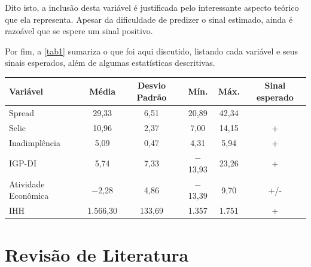 \documentclass[a4paper, article, 12pt, openany, oneside, english, brazil]{abntex2}
\numberwithin{equation}{section}
\begin{document}
    Dito isto, a inclusão desta variável é justificada pelo interessante aspecto teórico que ela representa. Apesar da dificuldade de predizer o sinal estimado, ainda é razoável que se espere um sinal positivo.

    Por fim, a \autoref{tab1} sumariza o que foi aqui discutido, listando cada variável e seus sinais esperados, além de algumas estatísticas descritivas.

    \begin{table}[h]
        {
            \begin{tabular}
                {@{\extracolsep{5pt}}lccccc}
                \midrule
                Variável              & \multicolumn{1}{c}{Média} & \multicolumn{1}{c}{Desvio Padrão} & \multicolumn{1}{c}{Mín.} & \multicolumn{1}{c}{Máx.} & \multicolumn{1}{c}{Sinal esperado} \\
                \midrule
                Spread                & 29,33                     & 6,51                              & 20,89                    & 42,34                    &  \\
                Selic                 & 10,96                     & 2,37                              & 7,00                     & 14,15                    & + \\
                Inadimplência         & 5,09                      & 0,47                              & 4,31                     & 5,94                     & + \\
                IGP-DI                & 5,74                      & 7,33                              & $-$13,93                 & 23,26                    & + \\
                Atividade Econômica   & $-$2,28                   & 4,86                              & $-$13,39                 & 9,70                     & +/- \\
                IHH                   & 1.566,30                  & 133,69                            & 1.357                    & 1.751                    & + \\
                \midrule
            \end{tabular}
        }
        {}
    \end{table}


\section{Revisão de Literatura}
\end{document}
